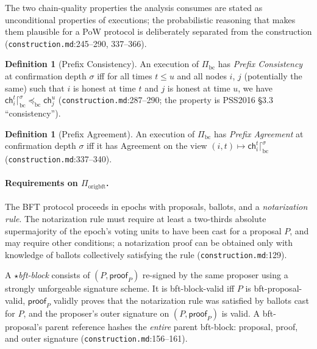 \documentclass[11pt,a4paper]{article}
\theoremstyle{definition}
\newtheorem{definition}[theorem]{Definition}
\begin{document}
The two chain-quality properties the analysis consumes are stated as
unconditional properties of executions; the probabilistic reasoning that
makes them plausible for a PoW protocol is deliberately separated from the
construction (\texttt{construction.md}:245--290, 337--366).

\begin{definition}[Prefix Consistency]\label{def:xl-prefix-consistency}
An execution of $\Pi_{\mathrm{bc}}$ has \emph{Prefix Consistency} at
confirmation depth $\sigma$ iff for all times $t \le u$ and all nodes $i$,
$j$ (potentially the same) such that $i$ is honest at time $t$ and $j$ is
honest at time $u$, we have $\mathsf{ch}_i^t \lceil^{\sigma}_{\mathrm{bc}}
\preceq_{\mathrm{bc}} \mathsf{ch}_j^u$ (\texttt{construction.md}:287--290;
the property is PSS2016 \S3.3 ``consistency'').
\end{definition}

\begin{definition}[Prefix Agreement]\label{def:xl-prefix-agreement}
An execution of $\Pi_{\mathrm{bc}}$ has \emph{Prefix Agreement} at
confirmation depth $\sigma$ iff it has Agreement on the view $(i, t)
\mapsto \mathsf{ch}_i^t \lceil^{\sigma}_{\mathrm{bc}}$
(\texttt{construction.md}:337--340).
\end{definition}

\paragraph{Requirements on $\Pi_{\mathrm{origbft}}$.} The BFT protocol
proceeds in epochs with proposals, ballots, and a \emph{notarization
rule}. The notarization rule must require at least a two-thirds absolute
supermajority of the epoch's voting units to have been cast for a
proposal $P$, and may require other conditions; a notarization proof can
be obtained only with knowledge of ballots collectively satisfying the
rule (\texttt{construction.md}:129).

A \emph{$\star$bft-block} consists of $(P, \mathsf{proof}_P)$ re-signed by
the same proposer using a strongly unforgeable signature scheme. It is
bft-block-valid iff $P$ is bft-proposal-valid, $\mathsf{proof}_P$ validly
proves that the notarization rule was satisfied by ballots cast for $P$,
and the proposer's outer signature on $(P, \mathsf{proof}_P)$ is valid. A
bft-proposal's parent reference hashes the \emph{entire} parent bft-block:
proposal, proof, and outer signature (\texttt{construction.md}:156--161).
\end{document}

